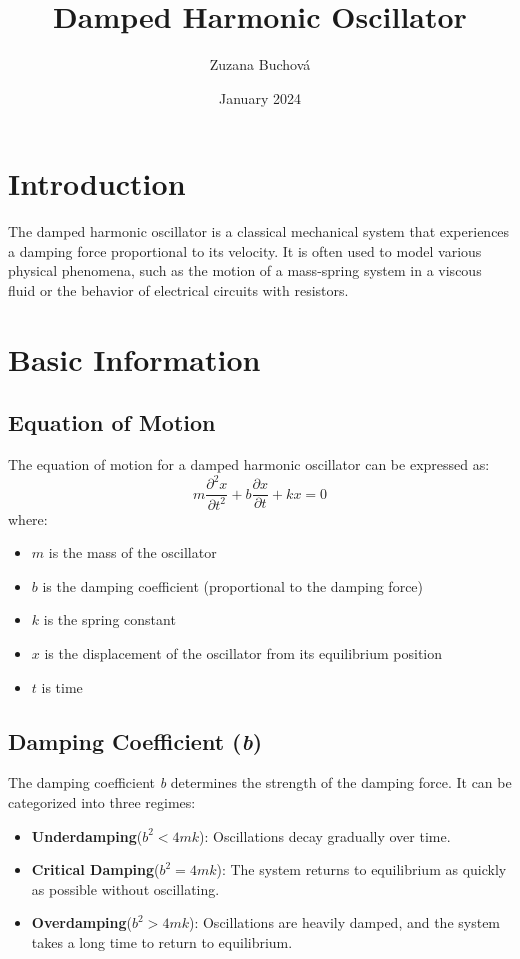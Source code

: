 \documentclass{article}
\title{Damped Harmonic Oscillator}
\author{Zuzana Buchová}
\date{January 2024}
\begin{document}
\maketitle

\section{Introduction}
The damped harmonic oscillator is a classical mechanical system that experiences a damping force proportional to its velocity. It is often used to model various physical phenomena, such as the motion of a mass-spring system in a viscous fluid or the behavior of electrical circuits with resistors.

\section{Basic Information}

\subsection{Equation of Motion}
The equation of motion for a damped harmonic oscillator can be expressed as:
\begin{equation}
    m\frac{\partial^2 x}{\partial t^2} + b\frac{\partial x}{\partial t} + kx = 0
\end{equation}
where:
\begin{itemize}
    \item $m$ is the mass of the oscillator
    \item $b$ is the damping coefficient (proportional to the damping force)
    \item $k$ is the spring constant
    \item $x$ is the displacement of the oscillator from its equilibrium position
    \item $t$ is time
\end{itemize}

\subsection{Damping Coefficient (\textit{b})}
The damping coefficient \textit{b} determines the strength of the damping force. It can be categorized into three regimes:
\begin{itemize}
    \item \textbf{Underdamping}($b^2 < 4mk$): Oscillations decay gradually over time.
    \item \textbf{Critical Damping}($b^2 = 4mk$): The system returns to equilibrium as quickly as possible without oscillating.
    \item \textbf{Overdamping}($b^2 > 4mk$): Oscillations are heavily damped, and the system takes a long time to return to equilibrium.
\end{itemize}
\end{document}
